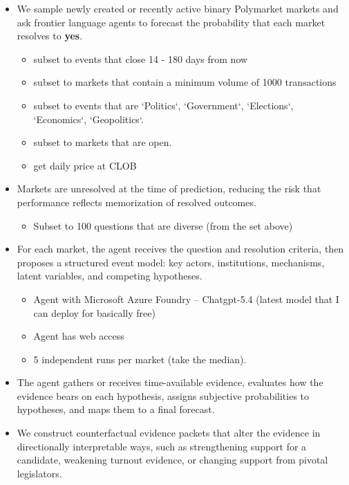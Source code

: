 \documentclass{article}
\begin{document}
\begin{itemize}
    \item We sample newly created or recently active binary Polymarket markets and ask frontier language agents to forecast the probability that each market resolves to \textbf{yes}.
        \begin{itemize}
        \item subset to events that close 14 - 180 days from now
        \item subset to markets that contain a minimum volume of 1000 transactions
        \item subset to events that are `Politics`, `Government`, `Elections`, `Economics`, `Geopolitics`.
        \item subset to markets that are open.
        \item get daily price at CLOB
        \end{itemize}

    \item Markets are unresolved at the time of prediction, reducing the risk that performance reflects memorization of resolved outcomes.
        \begin{itemize}
            \item Subset to 100 questions that are diverse (from the set above)
        \end{itemize}

    \item  For each market, the agent receives the question and resolution criteria, then proposes a structured event model: key actors, institutions, mechanisms, latent variables, and competing hypotheses.
        \begin{itemize}
            \item Agent with Microsoft Azure Foundry -- Chatgpt-5.4 (latest model that I can deploy for basically free)
            \item Agent has web access
            \item 5 independent runs per market (take the median).
        \end{itemize}

    \item  The agent gathers or receives time-available evidence, evaluates how the evidence bears on each hypothesis, assigns subjective probabilities to hypotheses, and maps them to a final forecast.

    \item We construct counterfactual evidence packets that alter the evidence in directionally interpretable ways, such as strengthening support for a candidate, weakening turnout evidence, or changing support from pivotal legislators.


\end{itemize}
\end{document}
